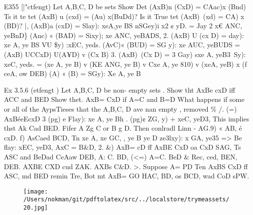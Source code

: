 \documentclass[a4paper,12pt]{article}
\begin{document}
\par

\vspace{10pt}

    E355 [|"ctfengt)   Let A,B,C, D be sets   Show Det (AxB)n (CxD) = CAac)x (Bnd)   Ts it te tet (AxB) u (cxd) = (Au) x(BuDd)?  Is it True tet (AxB)\ (xd) = CA\C) x (BD)?    |, (AxB)a (cxD) = Slay): xeA,ye BS nSGey)i x2 ¢ yD.  = Jay 2 x€ ANC, yeBnD\}    (Anc) « (BAD) = Sixy); xe ANC, yeBADS,  2. (AxB) U (cx D) = day): xe A, ye BS VU \$y) :xEC, yeds.    (AvC)« (BUD) = SG y): xe AUC, yeBUDS  = (AxB) UCCxD) U(A¥D) v (Cx B)    3. (AxB)\ (Cx D) = 3 Gay) sxe A, yeB3\ Sy): xeC, yeds.  = (xe A\C, ye B) v (KE ANG, ye B\D) v Cxe A, ye 810)  v (xeA, yeB) x (f ceA, ow DEB)  (A\C) « (B\D) = SGy): Xe A\C, ye B 

\vspace{10pt}

\par

\vspace{10pt}

    Ex 3.5.6 (etfengt )    Let A,B,C, D be non- empty sets .   Show tht AxBe cxD iff ACC and BED   Show thet. AxB= CxD if A=C and B=D   What happens if some or all of the AypsTieses that the A,B,C, D ave nan empty , removed \%    /. (=)  AxBéeEcxD 3 (pg) e Flay): xe A, ye Bh . (pg)¢ ZG, y) + xeC, yeD3,  This implies thst Ak Cad BED.  Fifer A Zg C or B g D. Then conlradl Linn - AG.9) « AB, é cxD.    f) AsCaed BCD,  Tn xe A, xe GC, , ye B ye D  ze3lxy): x GA, ye35 => Be flay: xEC, yeD3,  AxC = B\&D,    2. \&)  AxB= cD ff AxBE CxD oa CxD SAG,  Ts ASC and BeDad CeAaw DEB,  A: C. BD,  (<=)  A=C. BeD \& Rec, ced, BEN, DEB.  AXBE CXD cud ZAK.  AXBs C\&D.    >. Suppose A= PD Ten AxBS CxD ff ASC, md BED remin Tre,  Bot mt AxB= GO HAC, BD,  os BCD, wad CoD sPW. 

\vspace{10pt}

\par

\vspace{10pt}

\begin{figure}[h]

\texttt{[image: /Users/nokman/git/pdftolatex/src/../localstore/trymeassets/20.jpg]}

\centering

\end{figure}

\par
\end{document}
